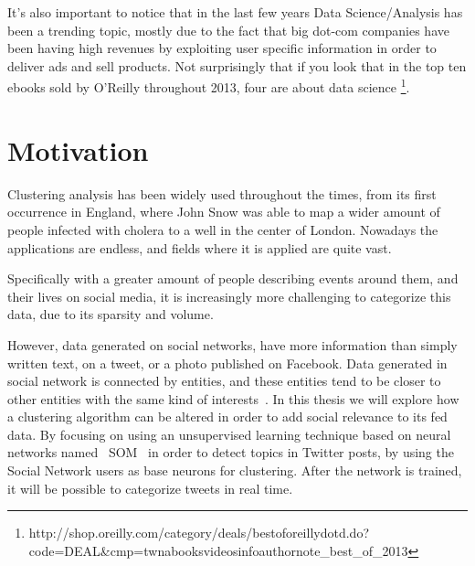 It's also important to notice that in the last few years Data Science/Analysis has been a trending topic, mostly due to the fact that big dot-com companies have been having high revenues by exploiting user specific information in order to deliver ads and sell products. Not surprisingly that if you look that in the top ten ebooks sold by O'Reilly throughout 2013, four are about data science \footnote{http://shop.oreilly.com/category/deals/best\-of\-oreilly\-dotd.do?code=DEAL\&cmp=tw\-na\-books\-videos\-info\-authornote\_best\_of\_2013}.
 

\section{Motivation}
Clustering analysis has been widely used throughout the times, from its first occurrence in England, where John Snow was able to map a wider amount of people infected with cholera to a well in the center of London. Nowadays the applications are endless, and fields where it is applied are quite vast.

Specifically with a greater amount of people describing events around them, and their lives on social media, it is increasingly more challenging to categorize this data, due to its sparsity and volume. 

However, data generated on social networks, have more information than simply written text, on a tweet, or a photo published on Facebook. Data generated in social network is connected by entities, and these entities tend to be closer to other entities with the same kind of interests~\cite{McPherson2001}. In this thesis we will explore how a clustering algorithm can be altered in order to add social relevance to its fed data. By focusing  on using an unsupervised learning technique based on neural networks named ~\ac{SOM}~\cite{Kohonen1990} in order to detect topics in Twitter posts, by using the Social Network users as base neurons for clustering. After the network is trained, it will be possible to categorize tweets in real time. 


